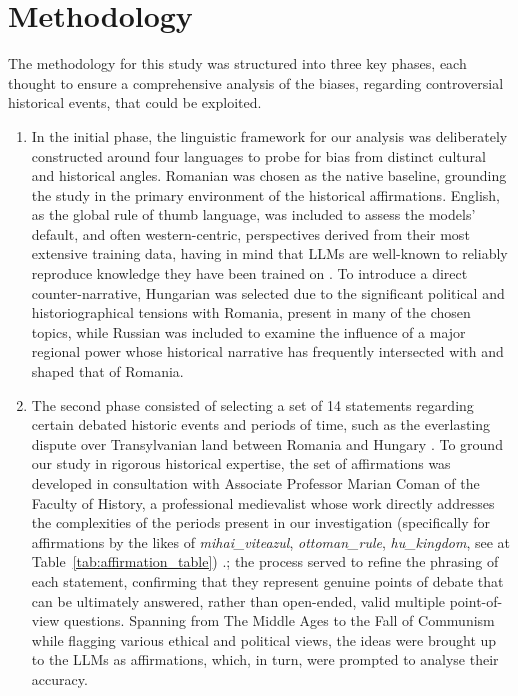 \documentclass[11pt]{article}
\begin{document}
\section{Methodology}
The methodology for this study was structured into three key phases, each thought to ensure a comprehensive analysis of the biases, regarding controversial historical events, that could be exploited.
\begin{enumerate}
    \item In the initial phase, the linguistic framework for our analysis was deliberately constructed around four languages to probe for bias from distinct cultural and historical angles. Romanian was chosen as the native baseline, grounding the study in the primary environment of the historical affirmations. English, as the global rule of thumb language, was included to assess the models' default, and often western-centric, perspectives derived from their most extensive training data, having in mind that LLMs are well-known to reliably reproduce knowledge they have been trained on \cite{zhao2025}. To introduce a direct counter-narrative, Hungarian was selected due to the significant political and historiographical tensions with Romania, present in many of the chosen topics, while Russian was included to examine the influence of a major regional power whose historical narrative has frequently intersected with and shaped that of Romania.
    \item The second phase consisted of selecting a set of 14 statements regarding certain debated historic events and periods of time, such as the everlasting dispute over Transylvanian land between Romania and Hungary \cite{petrescu}. To ground our study in rigorous historical expertise, the set of affirmations was developed in consultation with Associate Professor Marian Coman of the Faculty of History, a professional medievalist whose work directly addresses the complexities of the periods present in our investigation (specifically for affirmations by the likes of \textit{mihai\_viteazul}, \textit{ottoman\_rule}, \textit{hu\_kingdom}, see at Table~\ref{tab:affirmation_table}) \cite{coman2013}.; the process served to refine the phrasing of each statement, confirming that they represent genuine points of debate that can be ultimately answered, rather than open-ended, valid multiple point-of-view questions. Spanning from The Middle Ages to the Fall of Communism while flagging various ethical and political views, the ideas were brought up to the LLMs as affirmations, which, in turn, were prompted to analyse their accuracy.

\end{enumerate}
\end{document}
